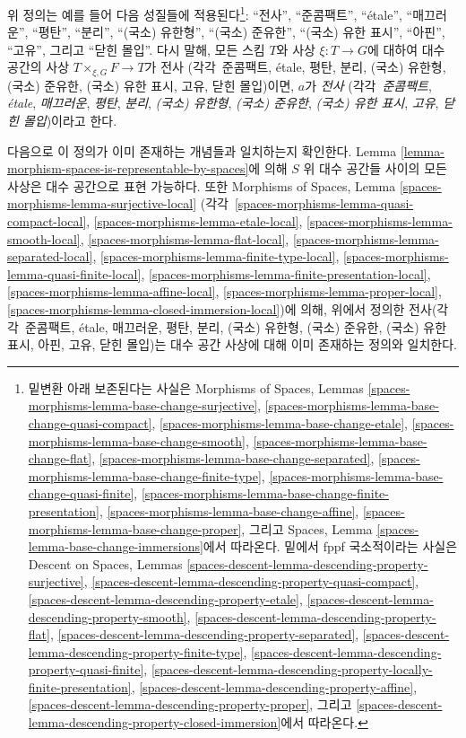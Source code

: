 \medskip\noindent
위 정의는 예를 들어 다음 성질들에 적용된다\footnote{밑변환 아래
보존된다는 사실은 Morphisms of Spaces, Lemmas
\ref{spaces-morphisms-lemma-base-change-surjective},
\ref{spaces-morphisms-lemma-base-change-quasi-compact},
\ref{spaces-morphisms-lemma-base-change-etale},
\ref{spaces-morphisms-lemma-base-change-smooth},
\ref{spaces-morphisms-lemma-base-change-flat},
\ref{spaces-morphisms-lemma-base-change-separated},
\ref{spaces-morphisms-lemma-base-change-finite-type},
\ref{spaces-morphisms-lemma-base-change-quasi-finite},
\ref{spaces-morphisms-lemma-base-change-finite-presentation},
\ref{spaces-morphisms-lemma-base-change-affine},
\ref{spaces-morphisms-lemma-base-change-proper}, 그리고
Spaces, Lemma
\ref{spaces-lemma-base-change-immersions}에서 따라온다.
밑에서 fppf 국소적이라는 사실은 Descent on Spaces, Lemmas
\ref{spaces-descent-lemma-descending-property-surjective},
\ref{spaces-descent-lemma-descending-property-quasi-compact},
\ref{spaces-descent-lemma-descending-property-etale},
\ref{spaces-descent-lemma-descending-property-smooth},
\ref{spaces-descent-lemma-descending-property-flat},
\ref{spaces-descent-lemma-descending-property-separated},
\ref{spaces-descent-lemma-descending-property-finite-type},
\ref{spaces-descent-lemma-descending-property-quasi-finite},
\ref{spaces-descent-lemma-descending-property-locally-finite-presentation},
\ref{spaces-descent-lemma-descending-property-affine},
\ref{spaces-descent-lemma-descending-property-proper}, 그리고
\ref{spaces-descent-lemma-descending-property-closed-immersion}에서 따라온다.
}:
``전사'',
``준콤팩트'',
``\'etale'',
``매끄러운'',
``평탄'',
``분리'',
``(국소) 유한형'',
``(국소) 준유한'',
``(국소) 유한 표시'',
``아핀'',
``고유'', 그리고
``닫힌 몰입''.
다시 말해, 모든 스킴 $T$와 사상 $\xi : T \to G$에 대하여 대수 공간의
사상 $T \times_{\xi, G} F \to T$가 전사
(각각\ 준콤팩트,
\'etale,
평탄,
분리,
(국소) 유한형,
(국소) 준유한,
(국소) 유한 표시,
고유,
닫힌 몰입)이면, $a$가 {\it 전사}
(각각\ {\it 준콤팩트},
{\it \'etale},
{\it 매끄러운},
{\it 평탄},
{\it 분리},
{\it (국소) 유한형},
{\it (국소) 준유한},
{\it (국소) 유한 표시},
{\it 고유},
{\it 닫힌 몰입})이라고 한다.

\medskip\noindent
다음으로 이 정의가 이미 존재하는 개념들과 일치하는지 확인한다.
Lemma \ref{lemma-morphism-spaces-is-representable-by-spaces}에 의해
$S$ 위 대수 공간들 사이의 모든 사상은 대수 공간으로 표현 가능하다.
또한 Morphisms of Spaces, Lemma
\ref{spaces-morphisms-lemma-surjective-local}
(각각\ \ref{spaces-morphisms-lemma-quasi-compact-local},
\ref{spaces-morphisms-lemma-etale-local},
\ref{spaces-morphisms-lemma-smooth-local},
\ref{spaces-morphisms-lemma-flat-local},
\ref{spaces-morphisms-lemma-separated-local},
\ref{spaces-morphisms-lemma-finite-type-local},
\ref{spaces-morphisms-lemma-quasi-finite-local},
\ref{spaces-morphisms-lemma-finite-presentation-local},
\ref{spaces-morphisms-lemma-affine-local},
\ref{spaces-morphisms-lemma-proper-local},
\ref{spaces-morphisms-lemma-closed-immersion-local})에 의해, 위에서 정의한
전사(각각\ 준콤팩트, \'etale, 매끄러운, 평탄, 분리, (국소) 유한형,
(국소) 준유한, (국소) 유한 표시, 아핀, 고유, 닫힌 몰입)는 대수 공간
사상에 대해 이미 존재하는 정의와 일치한다.

